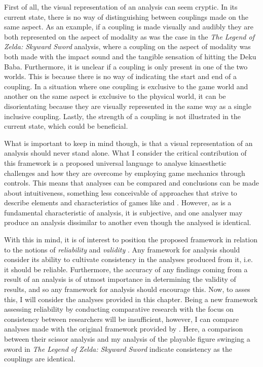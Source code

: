 First of all, the visual representation of an analysis can seem cryptic. In its current state, there is no way of distinguishing between couplings made on the same aspect. As an example, if a coupling is made visually and audibly they are both represented on the aspect of modality as was the case in the \textit{The Legend of Zelda: Skyward Sword} \cite{skyward} analysis, where a coupling on the aspect of modality was both made with the impact sound and the tangible sensation of hitting the Deku Baba. Furthermore, it is unclear if a coupling is only present in one of the two worlds. This is because there is no way of indicating the start and end of a coupling. In a situation where one coupling is exclusive to the game world and another on the same aspect is exclusive to the physical world, it can be disorientating because they are visually represented in the same way as a single inclusive coupling. Lastly, the strength of a coupling is not illustrated in the current state, which could be beneficial.

What is important to keep in mind though, is that a visual representation of an analysis should never stand alone. What I consider the critical contribution of this framework is a proposed universal language to analyse kinaesthetic challenges and how they are overcome by employing game mechanics through controls. This means that analyses can be compared and conclusions can be made about intuitiveness, something less conceivable of approaches that strive to describe elements and characteristics of games like  and . However, as is a fundamental characteristic of analysis, it is subjective, and one analyser may produce an analysis dissimilar to another even though the analysed is identical.

With this in mind, it is of interest to position the proposed framework in relation to the notions of \textit{reliability} and \textit{validity} \cite{cresswell}. Any framework for analysis should consider its ability to cultivate consistency in the analyses produced from it, i.e. it should be reliable. Furthermore, the accuracy of any findings coming from a result of an analysis is of utmost importance in determining the validity of results, and so any framework for analysis should encourage this. Now, to asses this, I will consider the analyses provided in this chapter. Being a new framework assessing reliability by conducting comparative research with the focus on consistency between researchers will be insufficient, however, I can compare  analyses made with the original framework provided by . Here, a comparison between their scissor analysis and my analysis of the playable figure swinging a sword in \textit{The Legend of Zelda: Skyward Sword} \cite{skyward} indicate consistency as the couplings are identical.

